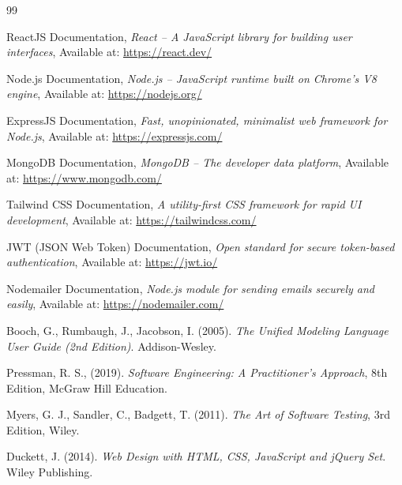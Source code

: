 \documentclass[12pt,a4paper]{report}
\begin{document}
\begin{thebibliography}{99}

ReactJS Documentation, \textit{React – A JavaScript library for building user interfaces}, 
Available at: \url{https://react.dev/}

Node.js Documentation, \textit{Node.js – JavaScript runtime built on Chrome's V8 engine}, 
Available at: \url{https://nodejs.org/}

ExpressJS Documentation, \textit{Fast, unopinionated, minimalist web framework for Node.js}, 
Available at: \url{https://expressjs.com/}

MongoDB Documentation, \textit{MongoDB – The developer data platform}, 
Available at: \url{https://www.mongodb.com/}

Tailwind CSS Documentation, \textit{A utility-first CSS framework for rapid UI development}, 
Available at: \url{https://tailwindcss.com/}

JWT (JSON Web Token) Documentation, \textit{Open standard for secure token-based authentication}, 
Available at: \url{https://jwt.io/}

Nodemailer Documentation, \textit{Node.js module for sending emails securely and easily}, 
Available at: \url{https://nodemailer.com/}

Booch, G., Rumbaugh, J., Jacobson, I. (2005). \textit{The Unified Modeling Language User Guide (2nd Edition)}. Addison-Wesley.

Pressman, R. S., (2019). \textit{Software Engineering: A Practitioner's Approach}, 8th Edition, McGraw Hill Education.

Myers, G. J., Sandler, C., Badgett, T. (2011). \textit{The Art of Software Testing}, 3rd Edition, Wiley.

Duckett, J. (2014). \textit{Web Design with HTML, CSS, JavaScript and jQuery Set}. Wiley Publishing.

\end{thebibliography}
\end{document}
